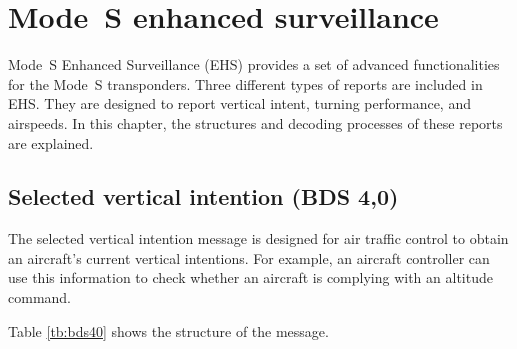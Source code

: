 \chapter{Mode~S enhanced surveillance}

Mode~S Enhanced Surveillance (EHS) provides a set of advanced functionalities for the Mode~S transponders. Three different types of reports are included in EHS. They are designed to report vertical intent, turning performance, and airspeeds. In this chapter, the structures and decoding processes of these reports are explained.

\section{Selected vertical intention (BDS 4,0)}

The selected vertical intention message is designed for air traffic control to obtain an aircraft's current vertical intentions. For example, an aircraft controller can use this information to check whether an aircraft is complying with an altitude command. 

Table \ref{tb:bds40} shows the structure of the message.

